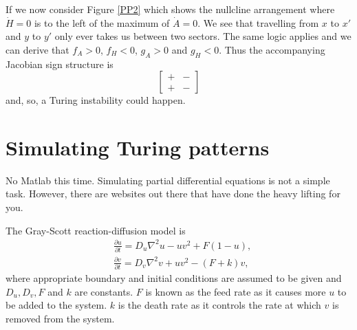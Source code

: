 \documentclass[10pt]{article}
\newcommand{\bb}{\begin{equation}}
\newcommand{\ee}{\end{equation}}
\newcommand{\D}[2]{\frac{\partial #1}{\partial #2}}
\newcommand{\fig}[1]{Figure \ref{#1}}
\begin{document}
\begin{Answ}
\begin{enumerate}
If we now consider \fig{PP2} which shows the nullcline arrangement where $\dot{H}=0$ is to the left of the maximum of $\dot{A}=0$. We see that travelling from $x$ to $x'$ and $y$ to $y'$ only ever takes us between two sectors. The same logic applies and we can derive that $f_A>0$, $f_H<0$, $g_A>0$ and $g_H<0$. Thus the accompanying Jacobian sign structure is
\bb
\left[ \begin {array}{cc} + & - \\ + & -\end {array} \right]
\ee
and, so, a Turing instability could happen.

\end{enumerate}
\end{Answ}



\section{Simulating Turing patterns}
No Matlab this time. Simulating partial differential equations is not a simple task. However, there are websites out there that have done the heavy lifting for you.

The Gray-Scott reaction-diffusion model is
\begin{align}
&\D{u}{t}=D_u\nabla^2u -uv^2+F(1-u),\label{EGS1}\\
&\D{v}{t}=D_v\nabla^2v +uv^2-(F+k)v,\label{EGS2}
\end{align}
where appropriate boundary and initial conditions are assumed to be given and $D_u, D_v, F$ and $k$ are constants. $F$ is known as the feed rate as it causes more $u$ to be added to the system. $k$ is the death rate as it controls the rate at which $v$ is removed from the system.
\end{document}
